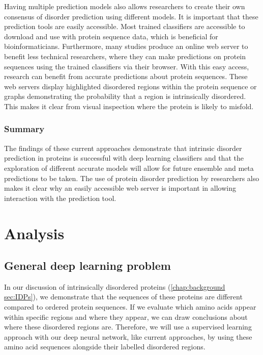\documentclass{l4proj}
\begin{document}
Having multiple prediction models also allows researchers to create their own consensus of disorder prediction using different models. It is important that these prediction tools are easily accessible. Most trained classifiers are accessible to download and use with protein sequence data, which is beneficial for bioinformaticians. Furthermore, many studies produce an online web server to benefit less technical researchers, where they can make predictions on protein sequences using the trained classifiers via their browser. With this easy access, research can benefit from accurate predictions about protein sequences. These web servers display highlighted disordered regions within the protein sequence or graphs demonstrating the probability that a region is intrinsically disordered. This makes it clear from visual inspection where the protein is likely to misfold.

\subsection{Summary}

The findings of these current approaches demonstrate that intrinsic disorder prediction in proteins is successful with deep learning classifiers and that the exploration of different accurate models will allow for future ensemble and meta predictions to be taken. The use of protein disorder prediction by researchers also makes it clear why an easily accessible web server is important in allowing interaction with the prediction tool.


\chapter{Analysis}

\section{General deep learning problem}

In our discussion of intrinsically disordered proteins (\ref{chap:background sec:IDPs}), we demonstrate that the sequences of these proteins are different compared to ordered protein sequences. If we evaluate which amino acids appear within specific regions and where they appear, we can draw conclusions about where these disordered regions are. Therefore, we will use a supervised learning approach with our deep neural network, like current approaches, by using these amino acid sequences alongside their labelled disordered regions.  
\end{document}

